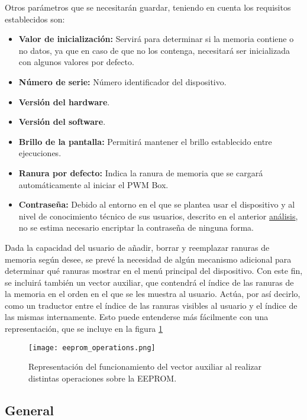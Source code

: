 Otros parámetros que se necesitarán guardar, teniendo en cuenta los requisitos establecidos son:

\begin{itemize}
    \item\textbf{Valor de inicialización:} Servirá para determinar si la memoria contiene o no datos, ya que en caso de que no los contenga, necesitará ser inicializada con algunos valores por defecto.
    \item\textbf{Número de serie:} Número identificador del dispositivo.
    \item\textbf{Versión del hardware}.
    \item\textbf{Versión del software}.
    \item\textbf{Brillo de la pantalla:} Permitirá mantener el brillo establecido entre ejecuciones.
    \item\textbf{Ranura por defecto:} Indica la ranura de memoria que se cargará automáticamente al iniciar el PWM Box.
    \item\textbf{Contraseña:} Debido al entorno en el que se plantea usar el dispositivo y al nivel de conocimiento técnico de sus usuarios, descrito en el anterior \hyperref[sec:fw_analisis]{análisis}, no se estima necesario encriptar la contraseña de ninguna forma.
\end{itemize}

Dada la capacidad del usuario de añadir, borrar y reemplazar ranuras de memoria según desee, se prevé la necesidad de algún mecanismo adicional para determinar qué ranuras mostrar en el menú principal del dispositivo. Con este fin, se incluirá también un vector auxiliar, que contendrá el índice de las ranuras de la memoria en el orden en el que se les muestra al usuario. Actúa, por así decirlo, como un traductor entre el índice de las ranuras visibles al usuario y el índice de las mismas internamente. Esto puede entenderse más fácilmente con una representación, que se incluye en la figura \ref{fig:eeprom_operations}

\begin{figure}[h!]
    \centering
    \texttt{[image: eeprom\_operations.png]}
    \caption{Representación del funcionamiento del vector auxiliar al realizar distintas operaciones sobre la EEPROM.}
    \label{fig:eeprom_operations}
\end{figure}

\subsection{General}

